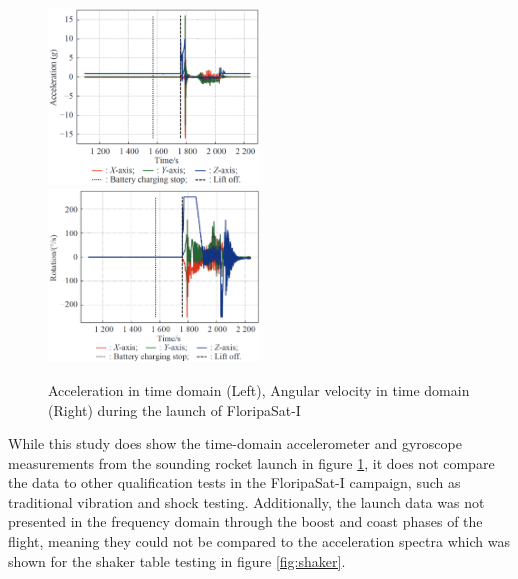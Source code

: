 \documentclass[a4paper,11pt]{article}
\begin{document}
\begin{figure}[H]
  \includegraphics[width=0.5\textwidth]{images/floripa-accel.png}
  \includegraphics[width=0.5\textwidth]{images/floripa-rot.png}
  \caption{Acceleration in time domain (Left), Angular velocity in time domain (Right) during the launch of FloripaSat-I \cite{9316404}}
  \label{fig:accel-rot}
\end{figure}

While this study does show the time-domain accelerometer and gyroscope measurements from the sounding rocket launch in figure \ref{fig:accel-rot}, it does not compare the data to other qualification tests in the FloripaSat-I campaign, such as traditional vibration and shock testing. Additionally, the launch data was not presented in the frequency domain through the boost and coast phases of the flight, meaning they could not be compared to the acceleration spectra which was shown for the shaker table testing in figure \ref{fig:shaker}.
\end{document}
